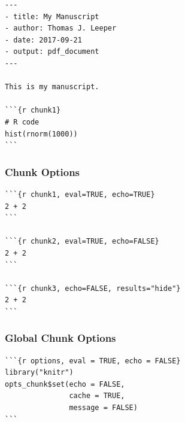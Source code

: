 \documentclass[14pt]{beamer}
\begin{document}
\begin{frame}[fragile]
\begin{verbatim}
---
- title: My Manuscript
- author: Thomas J. Leeper
- date: 2017-09-21
- output: pdf_document
---

This is my manuscript.

```{r chunk1}
# R code
hist(rnorm(1000))
```
\end{verbatim}
\end{frame}



\frame{}



\begin{frame}[fragile]

\frametitle{Chunk Options}

\begin{verbatim}
```{r chunk1, eval=TRUE, echo=TRUE}
2 + 2
```

```{r chunk2, eval=TRUE, echo=FALSE}
2 + 2
```

```{r chunk3, echo=FALSE, results="hide"}
2 + 2
```
\end{verbatim}
\end{frame}


\begin{frame}[fragile]

\frametitle{Global Chunk Options}

\begin{verbatim}
```{r options, eval = TRUE, echo = FALSE}
library("knitr")
opts_chunk$set(echo = FALSE, 
               cache = TRUE, 
               message = FALSE)
```
\end{verbatim}
\end{frame}
\end{document}
